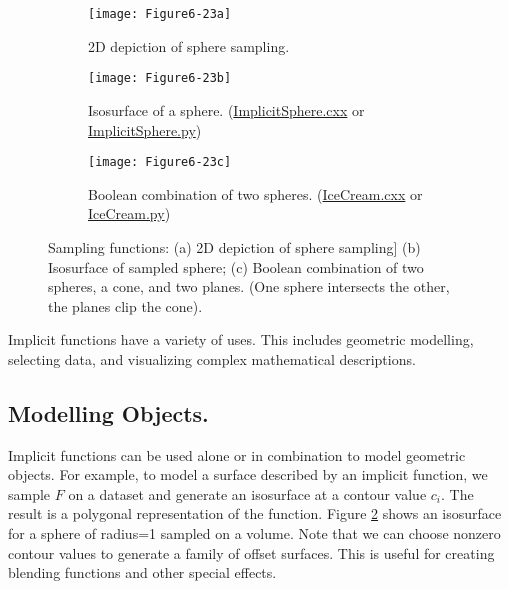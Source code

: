 \begin{figure}[htb]
	\begin{subfigure}[h]{0.32\linewidth}
		\texttt{[image: Figure6-23a]}
		\caption{2D depiction of sphere sampling.}
		\label{fig:Figure6-23a}
	\end{subfigure}
	\begin{subfigure}[h]{0.32\linewidth}
		\texttt{[image: Figure6-23b]}
		\caption{Isosurface of a sphere. (\href{https://lorensen.github.io/VTKExamples/site/Cxx/ImplicitFunctions/ImplicitSphere}{ImplicitSphere.cxx} or \href{https://lorensen.github.io/VTKExamples/site/Python/ImplicitFunctions/ImplicitSphere/}{ImplicitSphere.py})}
		\label{fig:Figure6-23b}
	\end{subfigure}
	\hfill
	\begin{subfigure}[h]{0.32\linewidth}
		\texttt{[image: Figure6-23c]}
		\caption{Boolean combination of two spheres. (\href{https://lorensen.github.io/VTKExamples/site/Cxx/VisualizationAlgorithms/IceCream}{IceCream.cxx} or \href{https://lorensen.github.io/VTKExamples/site/Python/VisualizationAlgorithms/IceCream/}{IceCream.py})}
		\label{fig:Figure6-23c}
	\end{subfigure}
	\caption{Sampling functions: (a) 2D depiction of sphere sampling] (b) Isosurface of sampled sphere; (c) Boolean combination of two spheres, a cone, and two planes. (One sphere intersects the other, the planes clip the cone).}\label{fig:Figure6-23}
\end{figure}

Implicit functions have a variety of uses. This includes geometric modelling, selecting data, and visualizing complex mathematical descriptions.

\subsection{Modelling Objects.}

Implicit functions can be used alone or in combination to model geometric objects. For example, to model a surface described by an implicit function, we sample $F$ on a dataset and generate an isosurface at a contour value $c_i$. The result is a polygonal representation of the function. Figure \ref{fig:Figure6-23b} shows an isosurface for a sphere of radius=1 sampled on a volume. Note that we can choose nonzero contour values to generate a family of offset surfaces. This is useful for creating blending functions and other special effects.

